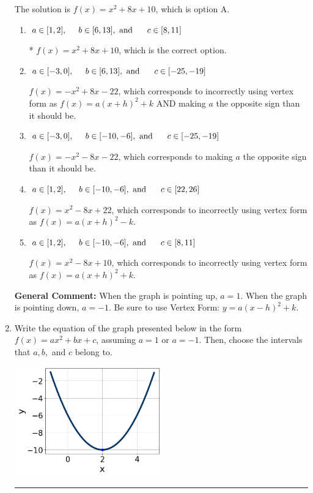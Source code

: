 \documentclass{extbook}[14pt]
\newcommand{\litem}[1]{\item #1

\rule{\textwidth}{0.4pt}}
\begin{document}
\begin{enumerate}
{The solution is \( f(x) = x^{2} +8 x + 10 \), which is option A.\begin{enumerate}[label=\Alph*.]
\item \( a \in [1, 2], \hspace*{5mm} b \in [6, 13], \text{ and } \hspace*{5mm} c \in [8, 11] \)

* $f(x)=x^{2} +8 x + 10$, which is the correct option.
\item \( a \in [-3, 0], \hspace*{5mm} b \in [6, 13], \text{ and } \hspace*{5mm} c \in [-25, -19] \)

$f(x)=-x^{2} +8 x -22$, which corresponds to incorrectly using vertex form as $f(x) = a(x+h)^2+k$ AND making $a$ the opposite sign than it should be.
\item \( a \in [-3, 0], \hspace*{5mm} b \in [-10, -6], \text{ and } \hspace*{5mm} c \in [-25, -19] \)

$f(x)=-x^{2} -8 x -22$, which corresponds to making $a$ the opposite sign than it should be.
\item \( a \in [1, 2], \hspace*{5mm} b \in [-10, -6], \text{ and } \hspace*{5mm} c \in [22, 26] \)

$f(x)=x^{2} -8 x + 22$, which corresponds to incorrectly using vertex form as $f(x) = a(x+h)^2 - k$.
\item \( a \in [1, 2], \hspace*{5mm} b \in [-10, -6], \text{ and } \hspace*{5mm} c \in [8, 11] \)

$f(x)=x^{2} -8 x + 10$, which corresponds to incorrectly using vertex form as $f(x) = a(x+h)^2+k$.
\end{enumerate}

\textbf{General Comment:} When the graph is pointing up, $a=1$. When the graph is pointing down, $a=-1$. Be sure to use Vertex Form: $y = a(x-h)^2+k$.
}
\litem{
Write the equation of the graph presented below in the form $f(x)=ax^2+bx+c$, assuming  $a=1$ or $a=-1$. Then, choose the intervals that $a, b,$ and $c$ belong to.

\begin{center}
    \includegraphics[width=0.5\textwidth]{../Figures/quadraticGraphToEquationCopyB.png}
\end{center}


}
\end{enumerate}
\end{document}
